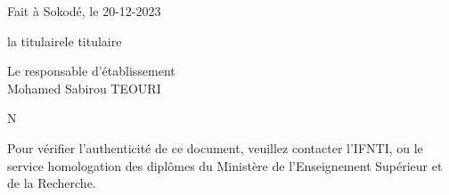 \documentclass[a4paper, landscape, 10pt]{article}
\begin{document}
Fait à Sokodé, le 20-12-2023 \\

\vspace{0.5cm}


\noindent
\begin{minipage}{0.49\textwidth}
	\begin{center}
		la titulairele titulaire\\
		\vspace{2cm}
		 
	\end{center}
\end{minipage}\hfill
\begin{minipage}{0.49\textwidth}
	\begin{center}
		Le responsable d'établissement\\
		\vspace{2cm}
		Mohamed Sabirou TEOURI
	\end{center}
\end{minipage}

\vspace{1.5cm}
\noindent
N\degre {}


\newpage


\vspace{-10cm}
\begin{center}
	Pour vérifier l’authenticité de ce document, veuillez contacter l’IFNTI,
	ou le service homologation des diplômes du Ministère de l’Enseignement Supérieur et de la Recherche.
\end{center}

\newpage

\end{document}
